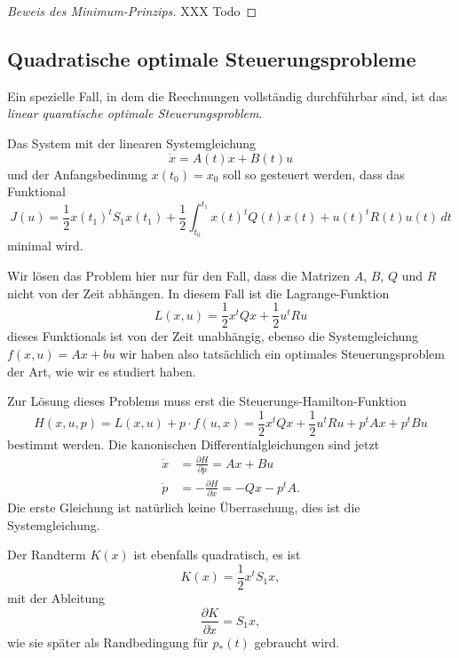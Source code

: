 \begin{proof}[Beweis des Minimum-Prinzips]

XXX Todo

\end{proof}

%
%
\subsection{Quadratische optimale Steuerungsprobleme
\label{buch:hamiltonjacobi:oc:subsection:quadratisch}}
Ein spezielle Fall, in dem die Reechnungen vollständig durchführbar sind,
ist das {\em linear quaratische optimale Steuerungsproblem}.
%

\begin{aufgabe}
\label{buch:hamiltonjacobi:oc:aufgabe:lqc}
Das System mit der linearen Systemgleichung
\begin{equation}
\dot{x}
=
A(t)x
+
B(t)u
\end{equation}
und der Anfangsbedinung $x(t_0)=x_0$ soll so gesteuert werden,
dass das Funktional
\begin{equation}
J(u)
=
\frac12 x(t_1)^t S_1 x(t_1)
+
\frac12
\int_{t_0}^{t_1}
x(t)^t Q(t) x(t)
+
u(t)^t R(t) u(t)
\,dt
\end{equation}
minimal wird.
\end{aufgabe}
Wir lösen das Problem hier nur für den Fall, dass die Matrizen $A$, $B$,
$Q$ und $R$ nicht von der Zeit abhängen.
In diesem Fall ist die Lagrange-Funktion
\[
L(x,u)
=
\frac12 x^t Qx + \frac12 u^t Ru
\]
dieses Funktionals ist von der Zeit unabhängig,
ebenso die Systemgleichung $f(x,u)=Ax+bu$ wir haben also tatsächlich ein
optimales Steuerungsproblem der Art, wie wir es studiert haben.

Zur Lösung dieses Problems muss erst die Steuerungs-Hamilton-Funktion
\[
H(x,u,p)
=
L(x,u) + p\cdot f(u,x)
=
\frac12 x^tQx + \frac12 u^tRu + p^tAx + p^tBu
\]
bestimmt werden.
Die kanonischen Differentialgleichungen sind jetzt
\begin{align*}
\dot{x}
&=
\frac{\partial H}{\partial p}
=
Ax
+
Bu
\\
\dot{p}
&=
-\frac{\partial H}{\partial x}
=
-Qx - p^tA.
\end{align*}
Die erste Gleichung ist natürlich keine Überraschung, dies ist die
Systemgleichung.

Der Randterm $K(x)$ ist ebenfalls quadratisch, es ist
\[
K(x) = \frac12 x^t S_1 x,
\]
mit der Ableitung
\begin{equation*}
\frac{\partial K}{\partial x}
=
S_1x,
\end{equation*}
wie sie später als Randbedingung für $p_*(t)$ gebraucht wird.

